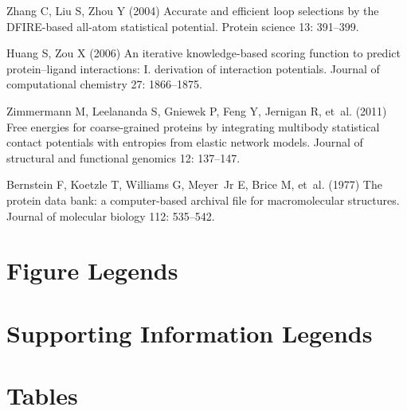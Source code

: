 \begin{thebibliography}{10}
Zhang C, Liu S, Zhou Y (2004) Accurate and efficient loop selections
by the
  {DFIRE}-based all-atom statistical potential.
\newblock Protein science 13: 391--399.

Huang S, Zou X (2006) An iterative knowledge-based scoring function
to predict
  protein--ligand interactions: I. derivation of interaction potentials.
\newblock Journal of computational chemistry 27: 1866--1875.

Zimmermann M, Leelananda S, Gniewek P, Feng Y, Jernigan R, et~al.
(2011) Free
  energies for coarse-grained proteins by integrating multibody statistical
  contact potentials with entropies from elastic network models.
\newblock Journal of structural and functional genomics 12: 137--147.

Bernstein F, Koetzle T, Williams G, Meyer~Jr E, Brice M, et~al.
(1977) The
  protein data bank: a computer-based archival file for macromolecular
  structures.
\newblock Journal of molecular biology 112: 535--542.

\end{thebibliography}



\newpage
\section*{Figure Legends}








\section*{Supporting Information Legends}


\newpage
\section*{Tables}













